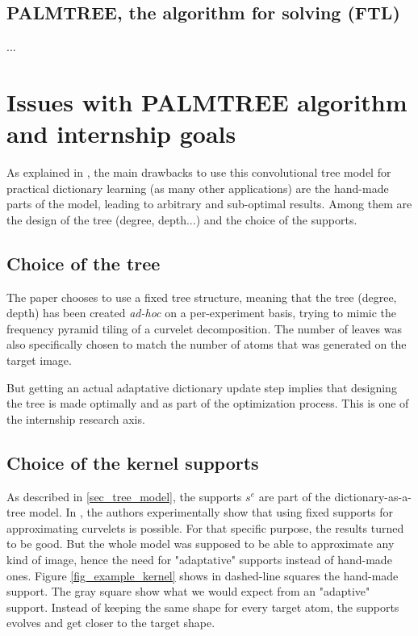 \subsection{PALMTREE, the algorithm for solving (FTL)}
...

\section{Issues with PALMTREE algorithm and internship goals}
As explained in \cite[p. 23]{chabiron_optimization_2016}, the main drawbacks to use this convolutional tree model for practical dictionary learning (as many other applications) are the hand-made parts of the model, leading to arbitrary and sub-optimal results. Among them are the design of the tree (degree, depth...) and the choice of the supports.
\subsection{Choice of the tree}
The paper chooses to use a fixed tree structure, meaning that the tree (degree, depth) has been created \emph{ad-hoc} on a per-experiment basis, trying to mimic the frequency pyramid tiling of a curvelet decomposition. The number of leaves was also specifically chosen to match the number of atoms that was generated on the target image.

But getting an actual adaptative dictionary update step implies that designing the tree is made optimally and as part of the optimization process. This is one of the internship research axis.

\subsection{Choice of the kernel supports}

As described in \ref{sec_tree_model}, the supports $s^e$ are part of the dictionary-as-a-tree model. In \cite{chabiron_toward_2015}, the authors experimentally show that using fixed supports for approximating curvelets is possible. For that specific purpose, the results turned to be good. But the whole model was supposed to be able to approximate any kind of image, hence the need for "adaptative" supports instead of hand-made ones. Figure \ref{fig_example_kernel} shows in dashed-line squares the hand-made support. The gray square show what we would expect from an "adaptive" support. Instead of keeping the same shape for every target atom, the supports evolves and get closer to the target shape.

